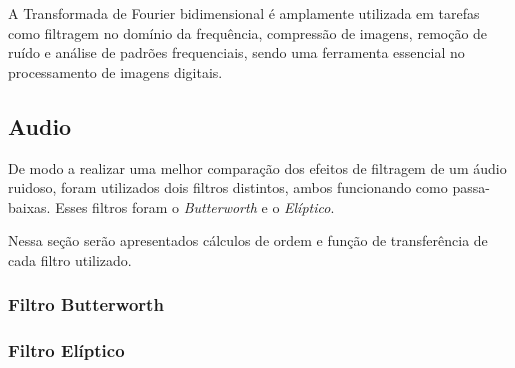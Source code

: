A Transformada de Fourier bidimensional é amplamente utilizada em tarefas como filtragem no domínio da frequência, compressão de imagens, remoção de ruído e análise de padrões frequenciais, sendo uma ferramenta essencial no processamento de imagens digitais.

\subsection{Audio}
De modo a realizar uma melhor comparação dos efeitos de filtragem de um áudio ruidoso, foram utilizados dois filtros distintos, ambos funcionando como passa-baixas. Esses filtros foram o \textit{Butterworth} e o \textit{Elíptico}.

Nessa seção serão apresentados cálculos de ordem e função de transferência de cada filtro utilizado.

\subsubsection{Filtro Butterworth}


\subsubsection{Filtro Elíptico}

